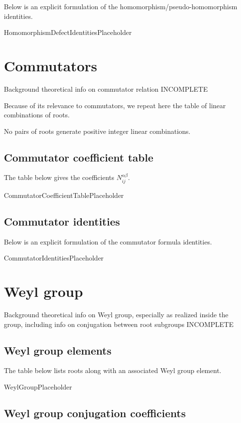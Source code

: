 \documentclass[11pt]{article}
\newcommand{\noi}{\noindent}
\theoremstyle{definition}
\begin{document}
\noi Below is an explicit formulation of the homomorphism/pseudo-homomorphism identities.

\bigskip

HomomorphismDefectIdentitiesPlaceholder

\newpage
\section{Commutators}

\noi Background theoretical info on commutator relation INCOMPLETE

\noi Because of its relevance to commutators, we repeat here the table of linear combinations of roots.

\noindent No pairs of roots generate positive integer linear combinations.


\subsection{Commutator coefficient table}

\noi The table below gives the coefficients $N_{ij}^{\alpha\beta}$.

CommutatorCoefficientTablePlaceholder

\subsection{Commutator identities}

\noi Below is an explicit formulation of the commutator formula identities.

CommutatorIdentitiesPlaceholder

\newpage
\section{Weyl group}

\noi Background theoretical info on Weyl group, especially as realized inside the group, including info on conjugation between root subgroups INCOMPLETE

\subsection{Weyl group elements}

\noi The table below lists roots along with an associated Weyl group element.

WeylGroupPlaceholder

\subsection{Weyl group conjugation coefficients}
\end{document}
